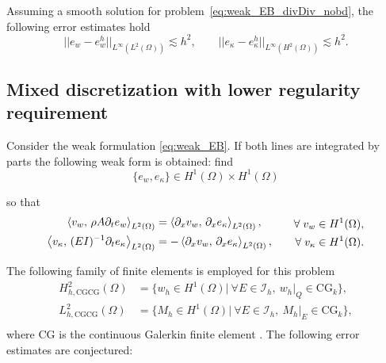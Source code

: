 \begin{conjecture}\label{conj:DG1Herestimates}
	Assuming a smooth solution for problem~\eqref{eq:weak_EB_divDiv_nobd}, the following error estimates hold
	\begin{equation}
	\label{eq:errDG1Her}
	||e_w - e_w^h||_{L^{\infty} (L^2(\Omega))} \lesssim h^{2}, \qquad
	||e_\kappa - e_\kappa^h||_{L^{\infty} (H^2(\Omega))} \lesssim h^{2}.
	\end{equation}
\end{conjecture}


\subsection{Mixed discretization with lower regularity requirement}
Consider the weak formulation \eqref{eq:weak_EB}. If both lines are integrated by parts the following weak form is obtained: find
\begin{equation*}
\{e_w, e_\kappa\} \in H^1(\Omega) \times H^1(\Omega) 
\end{equation*}

so that
\begin{equation}\label{eq:weak_EB_CGCG}
\begin{aligned}
\inner[L^2(\Omega)]{v_w}{\rho A \partial_t e_w} &= \inner[L^2(\Omega)]{\partial_{x} v_w}{\partial_{x} e_\kappa} , \\
\inner[L^2(\Omega)]{v_\kappa}{(EI)^{-1} \partial_t e_\kappa} &= -\inner[L^2(\Omega)]{\partial_{x} v_w}{\partial_{x} e_\kappa}, \\
\end{aligned}\qquad
\begin{aligned}
\forall \; v_w &\in H^1(\Omega), \\
\forall \; v_\kappa &\in H^1(\Omega).
\end{aligned}
\end{equation}

The following family of finite elements is employed for this problem
\begin{equation}\label{eq:CGCG}
\begin{aligned}
H_{h, \text{CGCG}}^{2}(\Omega) &= \{ w_h \in H^{1}(\Omega) | \ \forall E \in \mathcal{I}_h,\ w_h|_{Q} \in \mathrm{CG}_k \}, \\ 
L_{h, \text{CGCG}}^2(\Omega) &= \{M_h \in H^{1}(\Omega) | \ \forall E \in \mathcal{I}_h, \ M_h|_{E} \in \mathrm{CG}_k \}, \\
\end{aligned}
\end{equation}
where CG is the continuous Galerkin finite element \cite[Chapter 3]{logg2012}.  The following error estimates are conjectured:

